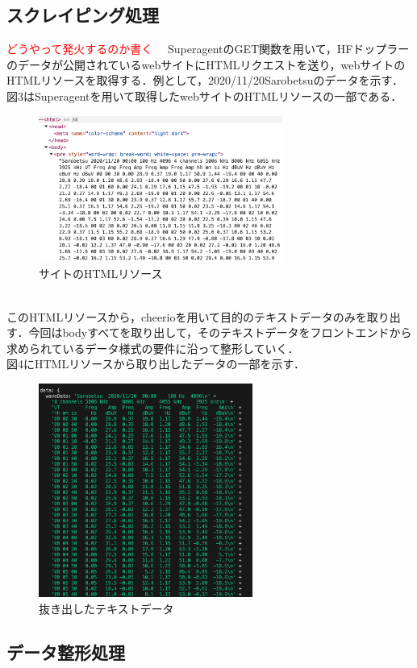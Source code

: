 \subsection{スクレイピング処理}
\textcolor{red}{どうやって発火するのか書く}
　SuperagentのGET関数を用いて，HFドップラーのデータが公開されているwebサイト\cite{hfd_link}にHTMLリクエストを送り，webサイトのHTMLリソースを取得する．例として，2020/11/20Sarobetsuのデータを示す．図3はSuperagentを用いて取得したwebサイトのHTMLリソースの一部である．\\
\begin{figure}[h]
  \centering
  \includegraphics[width=80mm]{fig/htmlRes.png}
  \caption{サイトのHTMLリソース}
\end{figure}\\
このHTMLリソースから，cheerioを用いて目的のテキストデータのみを取り出す．今回はbodyすべてを取り出して，そのテキストデータをフロントエンドから求められているデータ様式の要件に沿って整形していく．\\
図4にHTMLリソースから取り出したデータの一部を示す．
\begin{figure}[h]
   \centering
   \includegraphics[width=70mm]{fig/textData.png}
   \caption{抜き出したテキストデータ}
\end{figure}

\subsection{データ整形処理}

